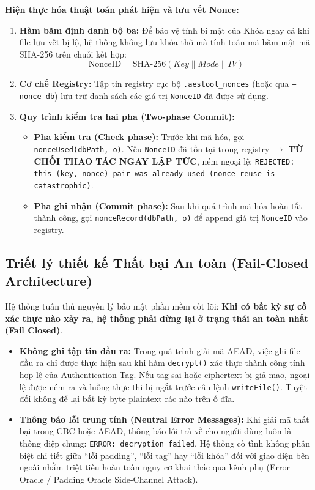 \documentclass[12pt, a4paper]{report}
\begin{document}
\textbf{Hiện thực hóa thuật toán phát hiện và lưu vết Nonce:}
\begin{enumerate}
    \item \textbf{Hàm băm định danh bộ ba:} Để bảo vệ tính bí mật của Khóa ngay cả khi file lưu vết bị lộ, hệ thống không lưu khóa thô mà tính toán mã băm mật mã SHA-256 trên chuỗi kết hợp:
    \[ \text{NonceID} = \text{SHA-256}(Key \parallel Mode \parallel IV) \]
    \item \textbf{Cơ chế Registry:} Tập tin registry cục bộ \texttt{.aestool\_nonces} (hoặc qua \texttt{--nonce-db}) lưu trữ danh sách các giá trị \texttt{NonceID} đã được sử dụng.
    \item \textbf{Quy trình kiểm tra hai pha (Two-phase Commit):}
    \begin{itemize}
        \item \textbf{Pha kiểm tra (Check phase):} Trước khi mã hóa, gọi \texttt{nonceUsed(dbPath, o)}. Nếu \texttt{NonceID} đã tồn tại trong registry $\rightarrow$ \textbf{TỪ CHỐI THAO TÁC NGAY LẬP TỨC}, ném ngoại lệ:
        \texttt{REJECTED: this (key, nonce) pair was already used (nonce reuse is catastrophic)}.
        \item \textbf{Pha ghi nhận (Commit phase):} Sau khi quá trình mã hóa hoàn tất thành công, gọi \texttt{nonceRecord(dbPath, o)} để append giá trị \texttt{NonceID} vào registry.
    \end{itemize}
\end{enumerate}

\subsection{Triết lý thiết kế Thất bại An toàn (Fail-Closed Architecture)}
Hệ thống tuân thủ nguyên lý bảo mật phần mềm cốt lõi: \textbf{Khi có bất kỳ sự cố xác thực nào xảy ra, hệ thống phải dừng lại ở trạng thái an toàn nhất (Fail Closed)}.
\begin{itemize}
    \item \textbf{Không ghi tập tin đầu ra:} Trong quá trình giải mã AEAD, việc ghi file đầu ra chỉ được thực hiện sau khi hàm \texttt{decrypt()} xác thực thành công tính hợp lệ của Authentication Tag. Nếu tag sai hoặc ciphertext bị giả mạo, ngoại lệ được ném ra và luồng thực thi bị ngắt trước câu lệnh \texttt{writeFile()}. Tuyệt đối không để lại bất kỳ byte plaintext rác nào trên ổ đĩa.
    \item \textbf{Thông báo lỗi trung tính (Neutral Error Messages):} Khi giải mã thất bại trong CBC hoặc AEAD, thông báo lỗi trả về cho người dùng luôn là thông điệp chung: \texttt{ERROR: decryption failed}. Hệ thống cố tình không phân biệt chi tiết giữa ``lỗi padding'', ``lỗi tag'' hay ``lỗi khóa'' đối với giao diện bên ngoài nhằm triệt tiêu hoàn toàn nguy cơ khai thác qua kênh phụ (Error Oracle / Padding Oracle Side-Channel Attack).
\end{itemize}
\end{document}
